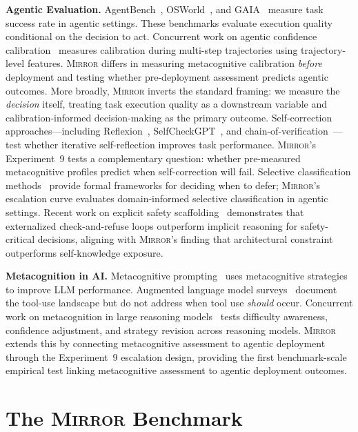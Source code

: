 \documentclass[10pt]{article}
\newcommand{\mirror}{\textsc{Mirror}}
\begin{document}
\textbf{Agentic Evaluation.}
AgentBench~\citep{liu2023agentbench}, OSWorld~\citep{xie2024osworld}, and
GAIA~\citep{mialon2023gaia} measure task success rate in agentic settings. These
benchmarks evaluate execution quality conditional on the decision to act.
Concurrent work on agentic confidence calibration~\citep{htc2026} measures
calibration during multi-step trajectories using trajectory-level features.
\mirror{} differs in measuring metacognitive calibration \textit{before} deployment
and testing whether pre-deployment assessment predicts agentic outcomes. More
broadly, \mirror{} inverts the standard framing: we measure the \textit{decision}
itself, treating task execution quality as a downstream variable and
calibration-informed decision-making as the primary outcome.
Self-correction approaches---including Reflexion~\citep{shinn2023reflexion},
SelfCheckGPT~\citep{manakul2023selfcheckgpt}, and
chain-of-verification~\citep{dhuliawala2023chainofverification}---test whether
iterative self-reflection improves task performance. \mirror{}'s Experiment~9
tests a complementary question: whether pre-measured metacognitive profiles predict
when self-correction will fail. Selective classification
methods~\citep{geifman2017selective} provide formal frameworks for deciding when
to defer; \mirror{}'s escalation curve evaluates domain-informed selective
classification in agentic settings.
Recent work on explicit safety scaffolding~\citep{mosaic2026} demonstrates that
externalized check-and-refuse loops outperform implicit reasoning for
safety-critical decisions, aligning with \mirror{}'s finding that architectural
constraint outperforms self-knowledge exposure.

\textbf{Metacognition in AI.}
Metacognitive prompting~\citep{wang2024metacognitive} uses metacognitive strategies
to improve LLM performance. Augmented language model surveys~\citep{mialon2023augmented}
document the tool-use landscape but do not address when tool use \textit{should}
occur. Concurrent work on metacognition in large reasoning
models~\citep{metacog2026} tests difficulty awareness, confidence adjustment, and
strategy revision across reasoning models. \mirror{} extends this by connecting
metacognitive assessment to agentic deployment through the Experiment~9 escalation
design, providing the first benchmark-scale empirical test linking metacognitive
assessment to agentic deployment outcomes.

\section{The \mirror{} Benchmark}
\label{sec:benchmark}
\end{document}
